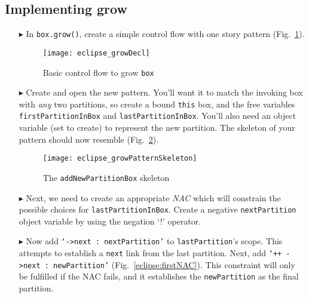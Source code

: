 \clearpage
\hypertarget{growBox tex}{}
\subsection{Implementing grow}
\texHeader

\vspace*{0.5cm}

\begin{itemize}

\item[$\blacktriangleright$] In \texttt{box.grow()}, create a simple control flow with one story pattern (Fig.~\ref{eclipse:growDecl}). 

\begin{figure}[htbp]
\begin{center}
  \texttt{[image: eclipse\_growDecl]}
  \caption{Basic control flow to grow \texttt{box}}
  \label{eclipse:growDecl}
\end{center}
\end{figure}

\item[$\blacktriangleright$] Create and open the new pattern. You'll want it to match the invoking box with \emph{any} two partitions, so create a bound
\texttt{this} box, and the free variables \texttt{firstPartitionInBox} and \texttt{lastPartitionInBox}. You'll also need an object variable (set to create) to
represent the new partition. The skeleton of your pattern should now resemble (Fig.~\ref{eclipse:growPattSkel}).

\vspace{0.5cm}

\begin{figure}[htbp]
\begin{center}
  \texttt{[image: eclipse\_growPatternSkeleton]}
  \caption{The \texttt{addNewPartitionBox} skeleton}
  \label{eclipse:growPattSkel}
\end{center}
\end{figure}

\item[$\blacktriangleright$] Next, we need to create an appropriate \emph{NAC} which will constrain the possible choices for \texttt{lastPartitionInBox}.
Create a negative \texttt{next\-Part\-it\-ion} object variable by using the negation `!' operator.

\vspace{0.5cm}

\item[$\blacktriangleright$] Now add \texttt{`->next : nextPartition'} to \texttt{lastPartition}'s scope. This attempts to establish a \texttt{next} link from
the last partition. Next, add \texttt{`++ ->next : newPartition'} (Fig.~\ref{eclipse:firstNAC}). This constraint will only be fulfilled if the NAC fails, and it
establishes the \texttt{newPartition} as the final partition.


\end{itemize}
